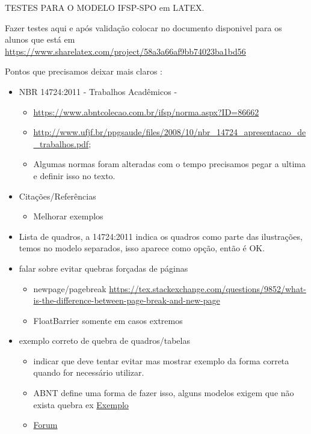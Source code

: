 TESTES PARA O MODELO IFSP-SPO em LATEX.

Fazer testes aqui e após validação colocar no documento disponivel para os alunos que está em \url{https://www.sharelatex.com/project/58a3a66af9bb74023ba1bd56}

\newpage


Pontos que precisamos deixar mais claros :


\begin{itemize}
\item NBR 14724:2011 - Trabalhos Acadêmicos -
    \begin{itemize}
        \item \url{https://www.abntcolecao.com.br/ifsp/norma.aspx?ID=86662}
        \item \url{http://www.ufjf.br/ppgsaude/files/2008/10/nbr_14724_apresentacao_de_trabalhos.pdf};
        \item Algumas normas foram alteradas com o tempo precisamos pegar a ultima e definir isso no texto.
    \end{itemize}

\item Citações/Referências
    \begin{itemize}
        \item Melhorar exemplos
    \end{itemize}

\item Lista de quadros, a 14724:2011 indica os quadros como parte das ilustrações, temos no modelo separados, isso aparece como opção, então é OK.

\item falar sobre evitar quebras forçadas de páginas
  \begin{itemize}
      \item newpage/pagebreak
      \url{https://tex.stackexchange.com/questions/9852/what-is-the-difference-between-page-break-and-new-page}
      \item  FloatBarrier somente em casos extremos 
  \end{itemize}

\item exemplo correto de quebra de quadros/tabelas
    \begin{itemize}
        \item indicar que deve tentar evitar mas mostrar exemplo da forma correta quando for necessário utilizar. 
        \item ABNT define uma forma de fazer isso, alguns modelos exigem que não exista quebra ex \href{http://www.seufuturonapratica.com.br/portal/fileadmin/user_upload/MANUAL_PARA_APRESENTACAO_DE_MONOGRAFIAS.pdf}{Exemplo}
        \item \href{https://groups.google.com/forum/#!topic/abntex2/l5Tlb-AxULc}{Forum}
    \end{itemize}


\end{itemize}
